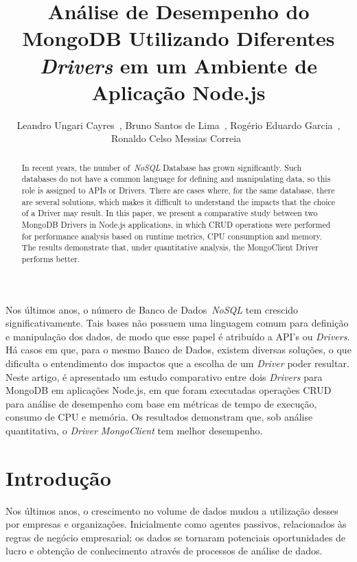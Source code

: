 \documentclass[12pt]{article}
\title{Análise de Desempenho do MongoDB Utilizando Diferentes \emph{Drivers} em um Ambiente de Aplicação Node.js}
\author{Leandro Ungari Cayres~\inst{1}, Bruno Santos de Lima~\inst{1}, Rogério Eduardo Garcia~\inst{1},\\ Ronaldo Celso Messias Correia~\inst{1}}
\begin{document}
 

\maketitle

\begin{abstract}
In recent years, the number of~\emph{NoSQL} Database has grown significantly. Such databases do not have a common language for defining and manipulating data, so this role is assigned to APIs or Drivers. There are cases where, for the same database, there are several solutions, which makes it difficult to understand the impacts that the choice of a Driver may result. In this paper, we present a comparative study between two MongoDB Drivers in Node.js applications, in which CRUD operations were performed for performance analysis based on runtime metrics, CPU consumption and memory. The results demonstrate that, under quantitative analysis, the MongoClient Driver performs better.
\end{abstract}
     
\begin{resumo} 
Nos últimos anos, o número de Banco de Dados~\emph{NoSQL} tem crescido significativamente. Tais bases não possuem uma linguagem comum para definição e manipulação dos dados, de modo que esse papel é atribuído a API's ou \emph{Drivers}. Há casos em que, para o mesmo Banco de Dados, existem diversas soluções, o que dificulta o entendimento dos impactos que a escolha de um \emph{Driver} poder resultar. Neste artigo, é apresentado um estudo comparativo entre dois \emph{Drivers} para MongoDB em aplicações Node.js, em que foram executadas operações CRUD para análise de desempenho com base em métricas de tempo de execução, consumo de CPU e memória. Os resultados demonstram que, sob análise quantitativa, o \emph{Driver} \emph{MongoClient} tem melhor desempenho.
\end{resumo}


\section{Introdução}
\label{sec:introducao}

Nos últimos anos, o crescimento no volume de dados mudou a utilização desses por empresas e organizações. Inicialmente como agentes passivos, relacionados às regras de negócio empresarial; os dados se tornaram potenciais oportunidades de lucro e obtenção de conhecimento através de processos de análise de dados.
\end{document}
